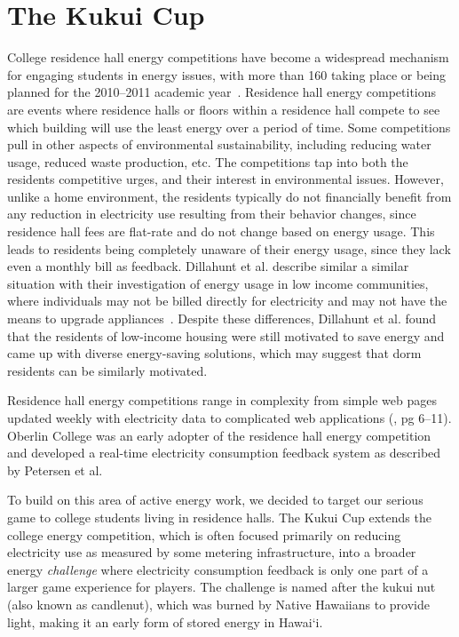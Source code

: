\documentclass{sigchi}
\newcommand{\Hawaii}{Hawai`i\xspace}
\begin{document}
\section{The Kukui Cup}

College residence hall energy competitions have become a widespread mechanism for engaging students in energy issues, with more than 160 taking place or being planned for the 2010--2011 academic year~\cite{Hodge2010}. Residence hall energy competitions are events where residence halls or floors within a residence hall compete to see which building will use the least energy over a period of time. Some competitions pull in other aspects of environmental sustainability, including reducing water usage, reduced waste production, etc. The competitions tap into both the residents competitive urges, and their interest in environmental issues. However, unlike a home environment, the residents typically do not financially benefit from any reduction in electricity use resulting from their behavior changes, since residence hall fees are flat-rate and do not change based on energy usage. This leads to residents being completely unaware of their energy usage, since they lack even a monthly bill as feedback. Dillahunt et al. describe similar a similar situation with their investigation of energy usage in low income communities, where individuals may not be billed directly for electricity and may not have the means to upgrade appliances~\cite{Dillahunt2009-low-income}. Despite these differences, Dillahunt et al. found that the residents of low-income housing were still motivated to save energy and came up with diverse energy-saving solutions, which may suggest that dorm residents can be similarly motivated.

Residence hall energy competitions range in complexity from simple web pages updated weekly with electricity data to complicated web applications (\cite{csdl2-11-01}, pg 6--11). Oberlin College was an early adopter of the residence hall energy competition and developed a real-time electricity consumption feedback system as described by Petersen et al.~\cite{petersen-dorm-energy-reduction}

To build on this area of active energy work, we decided to target our serious game to college students living in residence halls. The Kukui Cup extends the college energy competition, which is often focused primarily on reducing electricity use as measured by some metering infrastructure, into a broader energy \emph{challenge} where electricity consumption feedback is only one part of a larger game experience for players. The challenge is named after the kukui nut (also known as candlenut), which was burned by Native Hawaiians to provide light, making it an early form of stored energy in \Hawaii.
\end{document}
